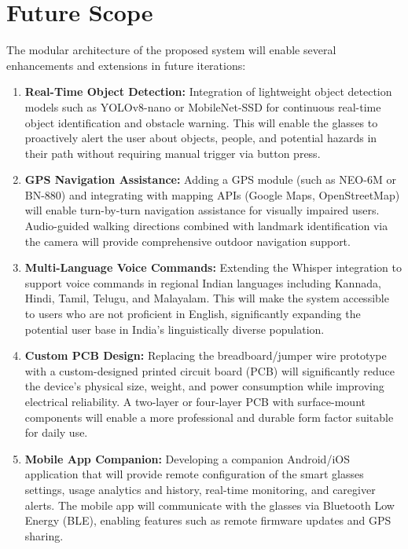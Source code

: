 \section{Future Scope}
The modular architecture of the proposed system will enable several enhancements and extensions in future iterations:

\begin{enumerate}[leftmargin=1.5cm]
\item \textbf{Real-Time Object Detection:} Integration of lightweight object detection models such as YOLOv8-nano or MobileNet-SSD for continuous real-time object identification and obstacle warning. This will enable the glasses to proactively alert the user about objects, people, and potential hazards in their path without requiring manual trigger via button press.

\item \textbf{GPS Navigation Assistance:} Adding a GPS module (such as NEO-6M or BN-880) and integrating with mapping APIs (Google Maps, OpenStreetMap) will enable turn-by-turn navigation assistance for visually impaired users. Audio-guided walking directions combined with landmark identification via the camera will provide comprehensive outdoor navigation support.

\item \textbf{Multi-Language Voice Commands:} Extending the Whisper integration to support voice commands in regional Indian languages including Kannada, Hindi, Tamil, Telugu, and Malayalam. This will make the system accessible to users who are not proficient in English, significantly expanding the potential user base in India's linguistically diverse population.

\item \textbf{Custom PCB Design:} Replacing the breadboard/jumper wire prototype with a custom-designed printed circuit board (PCB) will significantly reduce the device's physical size, weight, and power consumption while improving electrical reliability. A two-layer or four-layer PCB with surface-mount components will enable a more professional and durable form factor suitable for daily use.

\item \textbf{Mobile App Companion:} Developing a companion Android/iOS application that will provide remote configuration of the smart glasses settings, usage analytics and history, real-time monitoring, and caregiver alerts. The mobile app will communicate with the glasses via Bluetooth Low Energy (BLE), enabling features such as remote firmware updates and GPS sharing.


\end{enumerate}
